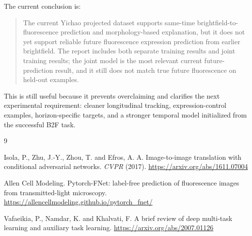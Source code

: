 \documentclass[11pt]{article}
\begin{document}
The current conclusion is:

\begin{quote}
The current Yichao projected dataset supports same-time brightfield-to-fluorescence prediction and morphology-based explanation, but it does not yet support reliable future fluorescence expression prediction from earlier brightfield. The report includes both separate training results and joint training results; the joint model is the most relevant current future-prediction result, and it still does not match true future fluorescence on held-out examples.
\end{quote}

This is still useful because it prevents overclaiming and clarifies the next experimental requirement: cleaner longitudinal tracking, expression-control examples, horizon-specific targets, and a stronger temporal model initialized from the successful B2F task.

\begin{thebibliography}{9}

Isola, P., Zhu, J.-Y., Zhou, T. and Efros, A. A.
Image-to-image translation with conditional adversarial networks.
\textit{CVPR} (2017).
\url{https://arxiv.org/abs/1611.07004}

Allen Cell Modeling.
Pytorch-FNet: label-free prediction of fluorescence images from transmitted-light microscopy.
\url{https://allencellmodeling.github.io/pytorch_fnet/}

Vafaeikia, P., Namdar, K. and Khalvati, F.
A brief review of deep multi-task learning and auxiliary task learning.
\url{https://arxiv.org/abs/2007.01126}

\end{thebibliography}
\end{document}
